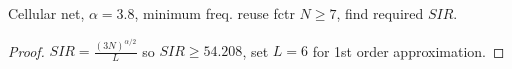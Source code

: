 \documentclass[./answersheet.tex]{subfiles}
\begin{document}
\begin{wts}
    Cellular net, $\alpha=3.8$, minimum freq. reuse fctr $N\geq 7$, find required $SIR$.
\end{wts}
\begin{proof}
    $SIR = \frac{(3N)^{\alpha/2}}{L}$ so $SIR\geq 54.208$, set $L=6$ for 1st order approximation.
\end{proof}
\end{document}
